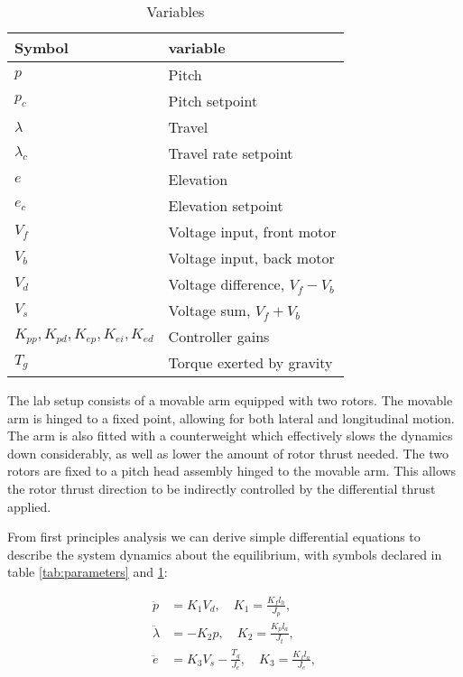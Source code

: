 \begin{table}[p]
	\centering
	\caption{Variables}
	\begin{tabular}{ll}
		\hline
		Symbol & variable \\
		\hline
		$p$ & Pitch \\
		$p_c$ & Pitch setpoint \\
		$\lambda$ & Travel \\
		$\lambda_c$ & Travel rate setpoint \\
		$e$ & Elevation \\
		$e_c$ & Elevation setpoint \\
		$V_f$ & Voltage input, front motor \\
		$V_b$ & Voltage input, back motor \\
		$V_d$ & Voltage difference, $V_f - V_b$ \\
		$V_s$ & Voltage sum, $V_f + V_b$ \\
		$K_{pp}, K_{pd}, K_{ep}, K_{ei}, K_{ed}$ & Controller gains \\
		$T_g$ & Torque exerted by gravity \\
		\hline
	\end{tabular}
	\label{tab:variables}
\end{table}
The lab setup consists of a movable arm equipped with two rotors. The movable arm is hinged to a fixed point, allowing for both lateral and longitudinal motion. The arm is also fitted with a counterweight which effectively slows the dynamics down considerably, as well as lower the amount of rotor thrust needed. The two rotors are fixed to a pitch head assembly hinged to the movable arm. This allows the rotor thrust direction to be indirectly controlled by the differential thrust applied.

From first principles analysis we can derive simple differential equations to describe the system dynamics about the equilibrium, with symbols declared in table \ref{tab:parameters} and \ref{tab:variables}:

\begin{subequations}
	\label{eq:dynamics}
	\begin{align}
		\ddot{p} &= K_1 V_d, \quad K_1 = \frac{K_f l_h}{J_p},\\
		\ddot{\lambda} &= -K_2 p, \quad K_2 = \frac{K_p l_a}{J_t},\\
		\ddot{e} &= K_3 V_s - \frac{T_g}{J_e}, \quad K_3 = \frac{K_f l_a}{J_e},
	\end{align}
\end{subequations}
\begin{equation*}
\end{equation*}

